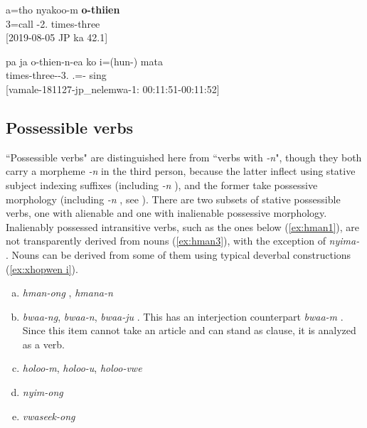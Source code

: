\ea\label{ex:o-thiien}
\gll a=tho nyakoo-m \textbf{o-thiien} \\ %
 3=call -2. times-three\\
\glt {} {[2019-08-05 JP ka 42.1]}
\z


\ea\label{ex:hunmata}\gll pa ja o-thien-n-ea ko i=(hun-) mata\\
   times-three--3.  .=- sing\\
\glt {} {[vamale-181127-jp\_nelemwa-1: 00:11:51-00:11:52]}
\z


%	
%	
%	
%	
%	
%	
%	
%	
%	
%	
%	
%	
%	


\subsection{Possessible verbs}
\label{ssec:PossV}

``Possessible verbs" are distinguished here from ``verbs with \textit{-n}", though they both carry a morpheme \textit{-n} in the third person, because the latter inflect using stative subject indexing suffixes (including \textit{-n} ), and the former take possessive morphology (including \textit{-n} , see ). There are two subsets of stative possessible verbs, one with alienable and one with inalienable possessive morphology. 
Inalienably possessed intransitive verbs, such as the ones below (\ref{ex:hman1}), are not transparently derived from nouns (\ref{ex:hman3}), with the exception of \textit{nyima-}  \goodtilde {}. Nouns can be derived from some of them using typical deverbal constructions (\ref{ex:xhopwen i}).
\begin{enumerate}[(a)]
\item \textit{hman-ong} , \textit{hmana-n}  
\item \textit{bwaa-ng}, \textit{bwaa-n}, \textit{bwaa-ju} . This has an interjection counterpart \textit{bwaa-m} . Since this item cannot take an article and can stand as clause, it is analyzed as a verb.
\item \textit{holoo-m}, \textit{holoo-u}, \textit{holoo-vwe} 
\item \textit{nyim-ong} 
\item \textit{vwaseek-ong} 
\end{enumerate}


